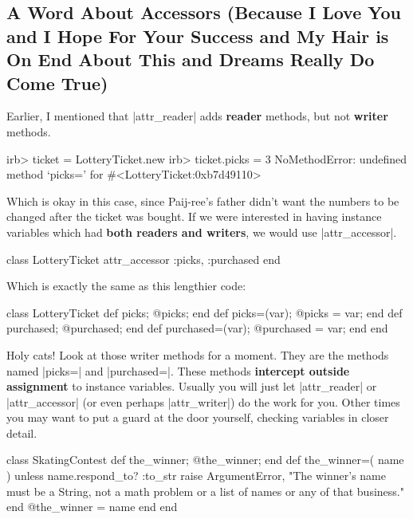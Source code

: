 \documentclass[12pt,twoside]{report}
\begin{document}
\subsection{A Word About Accessors (Because I Love You and I Hope For
  Your Success and My Hair is On End About This and Dreams Really Do
  Come True)}



Earlier, I mentioned that \rubyinline|attr_reader|
adds {\bf reader} methods, but not {\bf writer} methods.


\begin{consolecode}

 irb> ticket = LotteryTicket.new
 irb> ticket.picks = 3
 NoMethodError: undefined method `picks=' for #<LotteryTicket:0xb7d49110>

\end{consolecode}


Which is okay in this case, since Paij-ree's father didn't want the
numbers to be changed after the ticket was bought.  If we were
interested in having instance variables which had {\bf both readers
  and writers}, we would use
\rubyinline|attr_accessor|.


\begin{rubycode}

 class LotteryTicket
   attr_accessor :picks, :purchased
 end

\end{rubycode}


Which is exactly the same as this lengthier code:


\begin{rubycode}

 class LotteryTicket
   def picks;           @picks;            end
   def picks=(var);     @picks = var;      end
   def purchased;       @purchased;        end
   def purchased=(var); @purchased = var;  end
 end

\end{rubycode}


Holy cats!  Look at those writer methods for a moment.  They are the
methods named \rubyinline|picks=| and
\rubyinline|purchased=|.  These methods {\bf intercept
  outside assignment} to instance variables. Usually you will just let
\rubyinline|attr_reader| or
\rubyinline|attr_accessor| (or even perhaps
\rubyinline|attr_writer|) do the work for you. Other
times you may want to put a guard at the door yourself, checking
variables in closer detail.


\begin{rubycode}

 class SkatingContest
   def the_winner; @the_winner; end
   def the_winner=( name )
     unless name.respond_to? :to_str
       raise ArgumentError, "The winner's name must be a String,
         not a math problem or a list of names or any of that business."
     end
     @the_winner = name
   end
 end

\end{rubycode}
\end{document}
